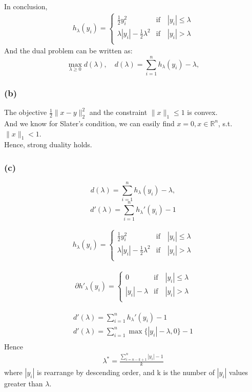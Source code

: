 \documentclass[12pt]{article}
\newcommand{\R}{\mathbb{R}}
\begin{document}
In conclusion,
\begin{align*}
    h_{\lambda}(y_i) = \begin{cases}
        \frac{1}{2} y_i^2 &\text{if} \quad |y_i| \leq \lambda \\
        \lambda|y_i| - \frac{1}{2} \lambda^2 &\text{if} \quad |y_i| > \lambda \\
    \end{cases}
\end{align*}
And the dual problem can be written as:
\[\max_{\lambda\geq 0} d(\lambda), \quad d(\lambda) = \sum_{i=1}^n h_\lambda(y_i) - \lambda,\]


\subsubsection{(b)}
The objective \(\frac{1}{2} \|x - y\|_2^2\) and the constraint \(\|x\|_1 \leq 1\) is convex. \\
And we know for Slater's condition, we can easily find \(x = 0, x \in \R^n\), s.t. \(\|x\|_1 < 1\). \\
Hence, strong duality holds.

\subsubsection{(c)}
\[d(\lambda) = \sum_{i=1}^n h_\lambda(y_i) - \lambda,\]
\[d'(\lambda) = \sum_{i=1}^{n} h_\lambda'(y_i) - 1\]

\begin{align*}
    h_{\lambda}(y_i) = \begin{cases}
        \frac{1}{2} y_i^2 &\text{if} \quad |y_i| \leq \lambda \\
        \lambda|y_i| - \frac{1}{2} \lambda^2 &\text{if} \quad |y_i| > \lambda \\
    \end{cases}
\end{align*}

\begin{align*}
    \partial h'_{\lambda}(y_i) = \begin{cases}
        0 &\text{if} \quad |y_i| \leq \lambda \\
        |y_i| - \lambda  &\text{if} \quad |y_i| > \lambda \\
    \end{cases}
\end{align*}

\begin{align*}
    d'(\lambda) = \sum_{i=1}^{n} h_\lambda'(y_i) - 1 \\
    d'(\lambda) = \sum_{i=1}^{n} \max\{|y_i| - \lambda, 0\} - 1 \\
\end{align*}
Hence
\begin{align*}
    \lambda^* = \frac{\sum_{i=n-k+1}^{n}|y_{i}| - 1}{k}
\end{align*}
where \(|y_i|\) is rearrange by descending order, and k is the number of \(|y_i|\) values greater than \(\lambda\).
\end{document}
